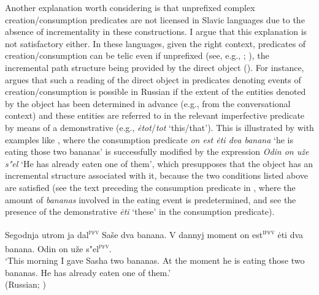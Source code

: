 \documentclass[output=paper,colorlinks,citecolor=brown]{langscibook}
\begin{document}


\noindent Another explanation worth considering is that unprefixed complex creation/con\-sump\-tion predicates are not licensed in Slavic languages due to the absence of incrementality in these constructions. I argue that this explanation is not satisfactory either. In these languages, given the right context, predicates of creation/consumption can be telic even if unprefixed (see, e.g., \citealt[179, fn. 41]{big:Gehrke2008}; \citealt{big:Mehlig2012}), the incremental path structure being provided by the direct object (\citealt{RappaportHovav2008, RappaportHovav2014}). For instance, \citet{big:Mehlig2012} argues that such a reading of the direct object in predicates denoting events of creation/consumption is possible in Russian if the extent of the entities denoted by the object has been determined in advance (e.g., from the conversational context) and these entities are referred to in the relevant imperfective predicate by means of a demonstrative (e.g., \textit{{\.e}tot}/\textit{tot} `this/that'). This is illustrated by \citet{big:Mehlig2012} with examples like , where the consumption predicate \textit{on est {\.e}ti dva banana} `he is eating those two bananas' is successfully modified by the expression \textit{Odin on uže s"el} `He has already eaten one of them', which presupposes that the object has an incremental structure associated with it, because the two conditions listed above are satisfied (see the text preceding the consumption predicate in , where the amount of \textit{bananas} involved in the eating event is predetermined, and see the presence of the demonstrative \textit{{\.e}ti} `these' in the consumption predicate).

\ea  \label{banana} Segodnja utrom ja dal\textsuperscript{\textsc{pfv}} Saše dva banana. V dannyj moment on est\textsuperscript{\textsc{ipfv}} {\.e}ti dva banana. Odin on uže s"el\textsuperscript{\textsc{pfv}}.\\
\glt `This morning I gave Sasha two bananas. At the moment he is eating those two bananas. He has already eaten one of them.' \\ \hfill (Russian; \citealt[216]{big:Mehlig2012}) \z
\end{document}
